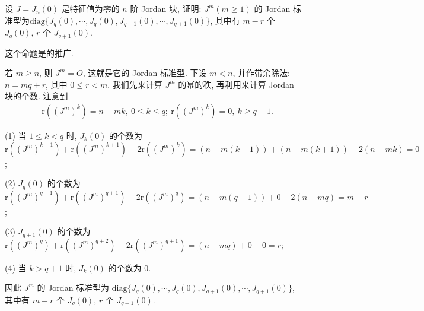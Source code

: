 \documentclass[../../main.tex]{subfiles}
\begin{document}
\begin{proposition}\label{proposition:J_n(0)的Jordan标准型的推广}
设 $J = J_n(0)$ 是特征值为零的 $n$ 阶 Jordan 块, 证明: $J^m (m \geq 1)$ 的 Jordan 标准型为$\mathrm{diag}\{J_q(0),\cdots,J_q(0),J_{q + 1}(0),\cdots,J_{q + 1}(0)\}$, 其中有 $m - r$ 个 $J_q(0)$, $r$ 个 $J_{q + 1}(0)$. 
\end{proposition}
\begin{remark}
这个命题是的推广.
\end{remark}
\begin{solution}
若 $m \geq n$, 则 $J^m = O$, 这就是它的 Jordan 标准型. 下设 $m < n$, 并作带余除法: $n = mq + r$, 其中 $0 \leq r < m$. 我们先来计算 $J^m$ 的幂的秩, 再利用来计算 Jordan 块的个数. 注意到
\begin{align*}
&\mathrm{r}((J^m)^k) = n - mk, \ 0 \leq k \leq q; \ 
\mathrm{r}((J^m)^k) = 0, \ k \geq q + 1.
\end{align*}

(1) 当 $1 \leq k < q$ 时, $J_k(0)$ 的个数为 $\mathrm{r}((J^m)^{k - 1}) + \mathrm{r}((J^m)^{k + 1}) - 2\mathrm{r}((J^m)^k) = (n - m(k - 1)) + (n - m(k + 1)) - 2(n - mk) = 0$;

(2) $J_q(0)$ 的个数为 $\mathrm{r}((J^m)^{q - 1}) + \mathrm{r}((J^m)^{q + 1}) - 2\mathrm{r}((J^m)^q) = (n - m(q - 1)) + 0 - 2(n - mq) = m - r$;

(3) $J_{q + 1}(0)$ 的个数为 $\mathrm{r}((J^m)^q) + \mathrm{r}((J^m)^{q + 2}) - 2\mathrm{r}((J^m)^{q + 1}) = (n - mq) + 0 - 0 = r$;

(4) 当 $k > q + 1$ 时, $J_k(0)$ 的个数为 $0$.

因此 $J^m$ 的 Jordan 标准型为 $\mathrm{diag}\{J_q(0),\cdots,J_q(0),J_{q + 1}(0),\cdots,J_{q + 1}(0)\}$, 其中有 $m - r$ 个 $J_q(0)$, $r$ 个 $J_{q + 1}(0)$. 
\end{solution}
\end{document}

